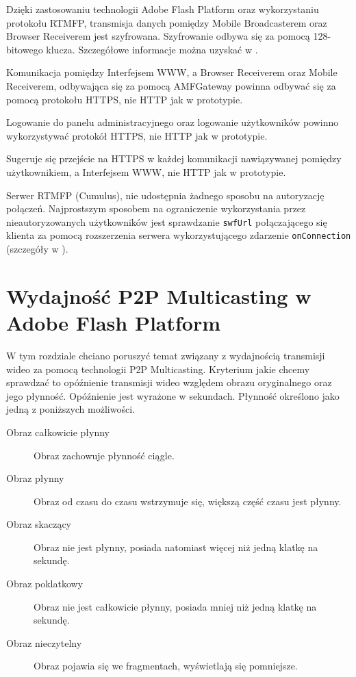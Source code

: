 \begin{packed_item}
    \item{Dzięki zastosowaniu technologii Adobe Flash Platform oraz wykorzystaniu protokołu RTMFP, transmisja danych pomiędzy Mobile Broadcasterem oraz Browser Receiverem jest szyfrowana. Szyfrowanie odbywa się za pomocą 128-bitowego klucza. Szczegółowe informacje można uzyskać w \cite{AdobeSecurity}}.
    \item{Komunikacja pomiędzy Interfejsem WWW, a Browser Receiverem oraz Mobile Receiverem, odbywająca się za pomocą AMFGateway powinna odbywać się za pomocą protokołu HTTPS, nie HTTP jak w prototypie.}
    \item{Logowanie do panelu administracyjnego oraz logowanie użytkowników powinno wykorzystywać protokół HTTPS, nie HTTP jak w prototypie.}
    \item{Sugeruje się przejście na HTTPS w każdej komunikacji nawiązywanej pomiędzy użytkownikiem, a Interfejsem WWW, nie HTTP jak w prototypie.}
    \item{Serwer RTMFP (Cumulus), nie udostępnia żadnego sposobu na autoryzację połączeń. Najprostszym sposobem na ograniczenie wykorzystania przez nieautoryzowanych użytkowników jest sprawdzanie \texttt{swfUrl} połączającego się klienta za pomocą rozszerzenia serwera wykorzystującego zdarzenie \texttt{onConnection} (szczegóły w \cite{CumulusDocs}).}
\end{packed_item}

\newpage
\section{Wydajność P2P Multicasting w Adobe Flash Platform}
\label{sec:ImplementacjaPrototypuWydajnoscP2P}
W tym rozdziale chciano poruszyć temat związany z wydajnością transmisji wideo za pomocą technologii P2P Multicasting. Kryterium jakie chcemy sprawdzać to opóźnienie transmisji wideo względem obrazu oryginalnego oraz jego płynność. Opóźnienie jest wyrażone w sekundach. Płynność określono jako jedną z poniższych możliwości.
\begin{description}
    \item[Obraz całkowicie płynny] Obraz zachowuje płynność ciągle.
    \item[Obraz płynny] Obraz od czasu do czasu wstrzymuje się, większą część czasu jest płynny.
    \item[Obraz skaczący] Obraz nie jest płynny, posiada natomiast więcej niż jedną klatkę na sekundę.
    \item[Obraz poklatkowy] Obraz nie jest całkowicie płynny, posiada mniej niż jedną klatkę na sekundę.
    \item[Obraz nieczytelny] Obraz pojawia się we fragmentach, wyświetlają się pomniejsze.
\end{description}

